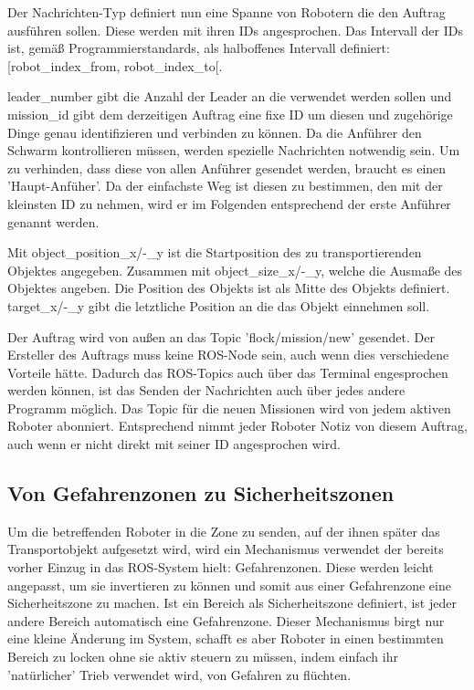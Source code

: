 Der Nachrichten-Typ definiert nun eine Spanne von Robotern die den Auftrag ausführen sollen. Diese werden mit ihren IDs angesprochen. Das Intervall der IDs ist, gemäß Programmierstandards, als halboffenes Intervall definiert: [robot\_index\_from, robot\_index\_to[.

leader\_number gibt die Anzahl der Leader an die verwendet werden sollen und mission\_id gibt dem derzeitigen Auftrag eine fixe ID um diesen und zugehörige Dinge genau identifizieren und verbinden zu können. Da die Anführer den Schwarm kontrollieren müssen, werden spezielle Nachrichten notwendig sein. Um zu verhinden, dass diese von allen Anführer gesendet werden, braucht es einen 'Haupt-Anfüher'. Da der einfachste Weg ist diesen zu bestimmen, den mit der kleinsten ID zu nehmen, wird er im Folgenden entsprechend der erste Anführer genannt werden.

Mit object\_position\_x/-\_y ist die Startposition des zu transportierenden Objektes angegeben. Zusammen mit object\_size\_x/-\_y, welche die Ausmaße des Objektes angeben. Die Position des Objekts ist als Mitte des Objekts definiert.
target\_x/-\_y gibt die letztliche Position an die das Objekt einnehmen soll.

Der Auftrag wird von außen an das Topic 'flock/mission/new' gesendet. Der Ersteller des Auftrags muss keine \ac{ROS}-Node sein, auch wenn dies verschiedene Vorteile hätte. Dadurch das \ac{ROS}-Topics auch über das Terminal engesprochen werden können, ist das Senden der Nachrichten auch über jedes andere Programm möglich. Das Topic für die neuen Missionen wird von jedem aktiven Roboter abonniert. Entsprechend nimmt jeder Roboter Notiz von diesem Auftrag, auch wenn er nicht direkt mit seiner ID angesprochen wird.\\


\subsection*{Von Gefahrenzonen zu Sicherheitszonen}

Um die betreffenden Roboter in die Zone zu senden, auf der ihnen später das Transportobjekt aufgesetzt wird, wird ein Mechanismus verwendet der bereits vorher Einzug in das \ac{ROS}-System hielt: Gefahrenzonen. Diese werden leicht angepasst, um sie invertieren zu können und somit aus einer Gefahrenzone eine Sicherheitszone zu machen. Ist ein Bereich als Sicherheitszone definiert, ist jeder andere Bereich automatisch eine Gefahrenzone.
Dieser Mechanismus birgt nur eine kleine Änderung im System, schafft es aber Roboter in einen bestimmten Bereich zu locken ohne sie aktiv steuern zu müssen, indem einfach ihr 'natürlicher' Trieb verwendet wird, von Gefahren zu flüchten.

